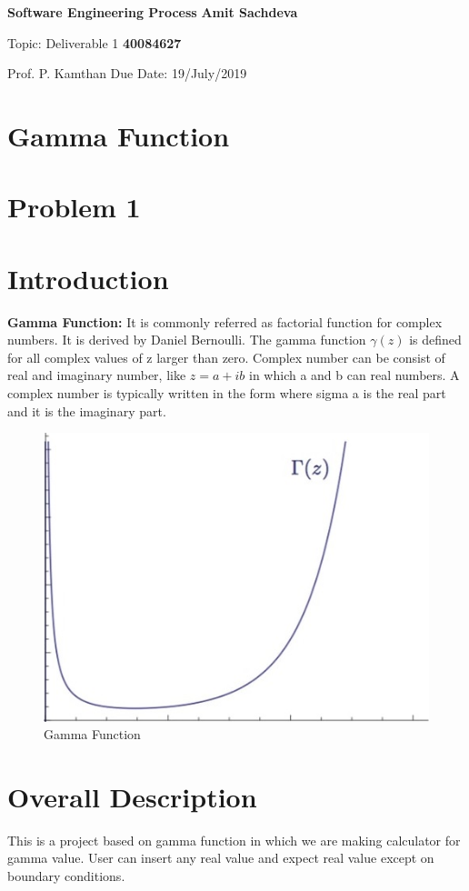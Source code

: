 \documentclass{article}
\begin{document}
\noindent
\large\textbf{Software Engineering Process} \hfill \textbf{Amit Sachdeva} 

\normalsize Topic: Deliverable 1 \hfill \textbf{40084627} 

Prof. P. Kamthan \hfill Due Date: 19/July/2019

\begin{center}
    \section*{Gamma Function}
    \section*{Problem 1}
\end{center}
\section{Introduction} 
\textbf{Gamma Function: } It is commonly referred as factorial function for complex numbers. It is derived by Daniel Bernoulli. The gamma function $\gamma(z)$ is defined for all complex values of z larger than zero. Complex number can be consist of real and imaginary number, like $z = a + i b$ in which a and b can real numbers. A complex number is typically written in the form where sigma a is the real part and it is the imaginary part.
\begin{figure}[h!]
\centering
\includegraphics[scale=0.4]{gamma1}
\caption{Gamma Function}
\label{fig:Gamma Function}
\end{figure}
\section{Overall Description} 
This is a project based on gamma function in which we are making calculator for gamma value. User can insert any real value and expect real value except on boundary conditions.
\end{document}
